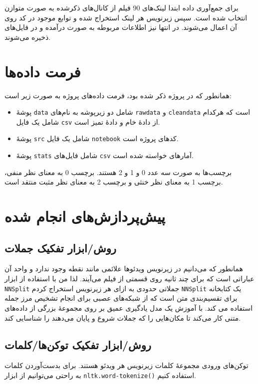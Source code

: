 برای جمع‌آوری داده ابتدا لینک‌های 90 فیلم از کانال‌های ذکرشده به صورت متوازن انتخاب شده است. سپس زیرنویس هر لینک استخراج شده و توابع موجود در کد روی آن اعمال می‌شوند. در انتها نیز اطلاعات مربوطه به صورت  درآمده و در فایل‌های  ذخیره می‌شوند.

\clearpage


\section{فرمت داده‌ها}
همانطور که در پروژه ذکر شده بود، فرمت داده‌های پروژه به صورت زیر است:
\begin{itemize}
    \item پوشۀ \texttt{data} شامل دو زیرپوشه به نام‌های \texttt{rawdata} و \texttt{cleandata} است که هرکدام شامل یک فایل \texttt{csv} از دادۀ خام و دادۀ تمیز است.
    \item پوشۀ \texttt{src} شامل یک فایل \texttt{notebook} کدهای پروژه است.
    \item پوشۀ \texttt{stats} شامل فایل‌های \texttt{csv} آمارهای خواسته شده است.
\end{itemize}
برچسب‌ها به صورت سه عدد 0 و 1 و 2 هستند. برچسب 0 به معنای نظر منفی، برچسب 1 به معنای نظر خنثی و برچسب 2 به معنای نظر مثبت منتقد است.

\section{پیش‌پردازش‌های انجام شده}
\subsection{روش/ابزار تفکیک جملات}
همانطور که می‌دانیم در زیرنویس ویدئوها علائمی مانند نقطه وجود ندارد و واحد آن عباراتی است که برای چند ثانیه روی قسمتی از فیلم می‌آیند. لذا من با استفاده از ابزار \texttt{NNSplit} جملاتی حدودی به ازای هر زیرنویس استخراج کردم
\texttt{NNSplit} یک کتابخانه برای تقسیم‌بندی متن است که از شبکه‌های عصبی برای انجام تشخیص مرز جمله استفاده می کند. با آموزش یک مدل یادگیری عمیق بر روی مجموعۀ بزرگی از داده‌های متنی کار می‌کند تا مکان‌هایی را که جملات شروع و پایان می‌دهند را شناسایی کند.

\subsection{روش/ابزار تفکیک توکن‌ها/کلمات}
توکن‌های ورودی مجموعۀ کلمات زیرنویس هر ویدئو هستند. برای بدست‌آوردن کلمات به راحتی می‌توانیم از ابزار \texttt{nltk.word-tokenize()} استفاده کنیم.

